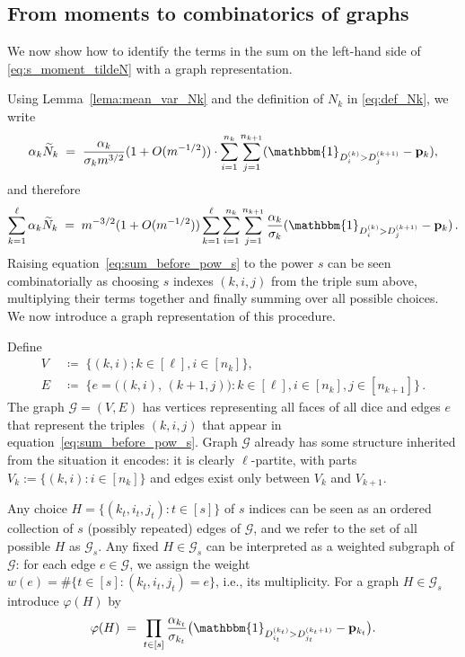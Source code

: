 \documentclass[reqno,a4paper,11pt]{amsart}
\theoremstyle{remark}
\newcommand{\mc}[1]{{\mathcal #1}}
\newcommand{\mb}[1]{{\mathbf #1}}
\newcommand{\ind}{\mathbbm{1}}
\numberwithin{equation}{section}
\begin{document}
\subsection{From moments to combinatorics of graphs}
\label{sec:sumtographs} \hfill 

We now show how to identify the terms in the sum on the left-hand side of \eqref{eq:s_moment_tildeN} with a graph representation.

Using Lemma~\ref{lema:mean_var_Nk} and the definition of $N_k$ in \eqref{eq:def_Nk}, we write
\begin{equation*}
\alpha_k \widetilde{N}_k
    \;=\; \frac{\alpha_k}{\sigma_k m^{3/2}} (1+O(m^{-1/2})) \cdot
        \sum_{i=1}^{n_k} \sum_{j=1}^{n_{k+1}}
        (\ind_{D_i^{(k)} > D_j^{(k+1)}} - \mb p_k),
\end{equation*}
%
and therefore
%
\begin{equation}
\label{eq:sum_before_pow_s}
\sum_{k=1}^{\ell}\alpha_k \widetilde{N}_k
    \;=\; m^{-3/2} (1+O(m^{-1/2})) \sum_{k=1}^{\ell} \sum_{i=1}^{n_k} \sum_{j=1}^{n_{k+1}}
        \frac{\alpha_k}{\sigma_k} (\ind_{D_i^{(k)} > D_j^{(k+1)}} - \mb
        p_k)\,.
\end{equation}
Raising equation~\eqref{eq:sum_before_pow_s} to the power $s$ can be seen
combinatorially as choosing $s$ indexes $(k, i, j)$
from the triple sum above, multiplying their terms together and finally
summing over all possible choices. We now introduce a graph representation of this procedure. 

Define
%
\begin{equation}\label{eq:def_VEgraphG}
\begin{aligned}
V &\;\coloneqq\; \{(k,i); k \in [\ell], i \in [n_k]\},\\
E &\;\coloneqq\; \{e = \bigl((k,i),\, (k+1,j)\bigr):
        k\in [\ell], i \in [n_k], j\in [n_{k+1}]\}\,.
\end{aligned}
\end{equation}
%
The graph $\mc G = (V,E)$ has vertices representing all faces of all
dice and edges $e$ that represent the triples $(k, i, j)$ that appear in
equation~\eqref{eq:sum_before_pow_s}. Graph $\mc G$ already has some structure
inherited from the situation it encodes: it is clearly $\ell$-partite, with
parts $V_k := \{(k,i): i \in [n_k]\}$ and edges exist only between $V_k$ and
$V_{k+1}$.

Any choice $H = \{(k_t, i_t, j_t): t \in [s]\}$ of $s$ indices can be seen as
an ordered collection of $s$ (possibly repeated) edges of $\mc G$, and we refer
to the set of all possible $H$ as $\mc G_s$. Any fixed $H \in \mc G_s$
can be interpreted as a weighted subgraph of $\mc G$: for each edge $e \in \mc
G$, we assign the weight $w(e) = \# \{t \in [s]: (k_t, i_t, j_t)=e\}$, i.e.,
its multiplicity. 
For a graph $H \in \mc G_s$ introduce $\varphi(H)$ by
\begin{equation}
\label{eq:def_varphi_H}
\varphi(H)
    \;=\; \prod_{t \in [s]} \frac{\alpha_{k_t}}{\sigma_{k_t}}
        \bigl(\ind_{D^{(k_t)}_{i_t} > D^{(k_t+1)}_{j_t}} - \mb p_{k_t}\bigr).
\end{equation}
\end{document}
